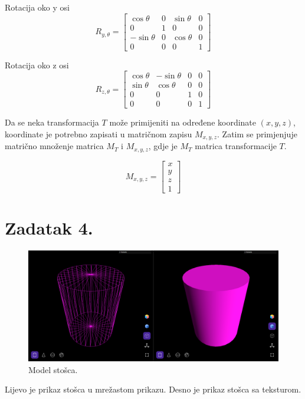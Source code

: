 \documentclass[a4paper,12pt]{article}
\begin{document}
Rotacija oko y osi
\[
R_{y,\theta}=
\begin{bmatrix}
    \cos{\theta} & 0 & \sin{\theta} & 0 \\
    0 & 1 & 0 & 0 \\
    -\sin{\theta} & 0 & \cos{\theta} & 0 \\
    0 & 0 & 0 & 1
\end{bmatrix}
\]

Rotacija oko z osi
\[
R_{z,\theta}=
\begin{bmatrix}
    \cos{\theta} & -\sin{\theta} & 0 & 0 \\
    \sin{\theta} & \cos{\theta} & 0 & 0 \\
    0 & 0 & 1 & 0 \\
    0 & 0 & 0 & 1
\end{bmatrix}
\]

\pagebreak

Da se neka transformacija $T$ može primijeniti na određene koordinate $(x, y, z)$, koordinate je
potrebno zapisati u matričnom zapisu $M_{x,y,z}$. Zatim se primjenjuje matrično množenje
matrica $M_T$ i $M_{x,y,z}$, gdje je $M_T$ matrica transformacije $T$.

\[
M_{x,y,z}=
\begin{bmatrix}
    x \\
    y \\
    z \\
    1
\end{bmatrix}
\]
\pagebreak

\section*{Zadatak 4.}

\begin{figure}[ht]
    \centering
    \includegraphics[scale=0.5]{image/zadatak4.png}
    \caption{Model stošca.}
\end{figure}
Lijevo je prikaz stošca u mrežastom prikazu. Desno je prikaz stošca sa teksturom.
\end{document}
